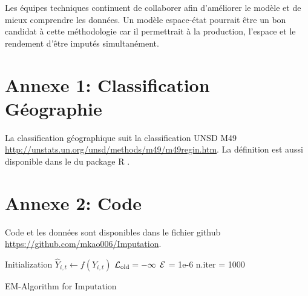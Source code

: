 \documentclass[nojss]{jss}\usepackage{graphicx, color}
\begin{document}
Les \'{e}quipes techniques continuent de collaborer afin
d'am\'{e}liorer le mod\`{e}le et de mieux comprendre les
donn\'{e}es. Un mod\`{e}le espace-\'{e}tat pourrait \^{e}tre un bon
candidat \`{a} cette m\'{e}thodologie car il permettrait \`{a} la
production, l'espace et le rendement d'\^{e}tre imput\'{e}s
simultan\'{e}ment.



\section*{Annexe 1: Classification G\'{e}ographie}

La classification g\'{e}ographique suit la classification UNSD M49
\url{http://unstats.un.org/unsd/methods/m49/m49regin.htm}. La
d\'{e}finition est aussi disponible dans le  du
package R .


\section*{Annexe 2: Code}


Code et les donn\'{e}es sont disponibles dans le fichier github
\url{https://github.com/mkao006/Imputation}.

\begin{algorithm}
  \SetAlgoLined
  \BlankLine
  Initialization\;
  \Indp\Indp\Indp 
  $\hat{Y}_{i, t} \leftarrow f(Y_{i, t})$\;
  $\cal{L}_{\text{old}} = -\infty$\;
  $\cal{E}$ = 1e-6\;
  n.iter = 1000\;
  \Indm\Indm\Indm 
  
    \caption{EM-Algorithm for Imputation}
    \label{alg:imputation}
\end{algorithm}
  
      
\end{document}
